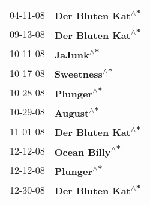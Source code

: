 \begin{supertabular}{p{0.25\columnwidth}p{0.75\columnwidth}}
 04-11-08 &  \textbf{Der Bluten Kat\textsuperscript{$\wedge$*}} \\
 09-13-08 &  \textbf{Der Bluten Kat\textsuperscript{$\wedge$*}} \\
 10-11-08 &          \textbf{JaJunk\textsuperscript{$\wedge$*}} \\
 10-17-08 &       \textbf{Sweetness\textsuperscript{$\wedge$*}} \\
 10-28-08 &         \textbf{Plunger\textsuperscript{$\wedge$*}} \\
 10-29-08 &          \textbf{August\textsuperscript{$\wedge$*}} \\
 11-01-08 &  \textbf{Der Bluten Kat\textsuperscript{$\wedge$*}} \\
 12-12-08 &     \textbf{Ocean Billy\textsuperscript{$\wedge$*}} \\
 12-12-08 &         \textbf{Plunger\textsuperscript{$\wedge$*}} \\
 12-30-08 &  \textbf{Der Bluten Kat\textsuperscript{$\wedge$*}} \\
\end{supertabular}
